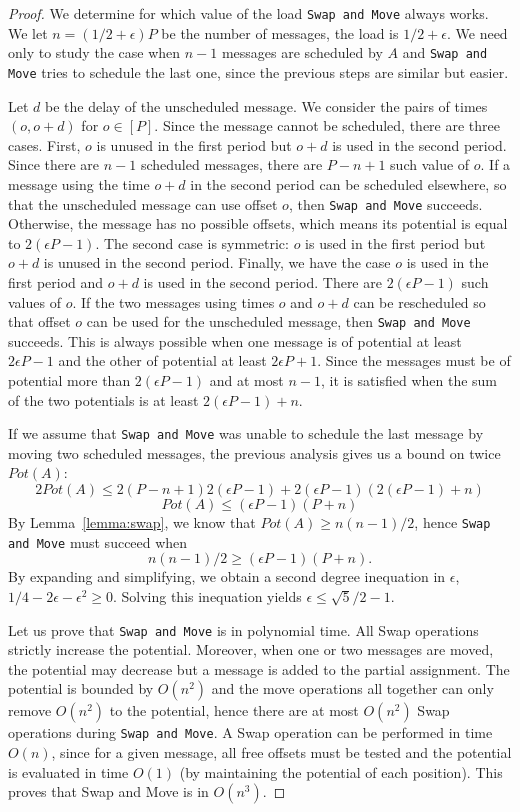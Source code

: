 \documentclass[a4paper,cleveref, autoref, thm-restate,UKenglish]{lipics-v2019}
\newcommand\swapandmove{\texttt{Swap and Move}\xspace}
\begin{document}
\begin{proof}
We determine for which value of the load \swapandmove always works. We let $n = (1/2 + \epsilon)P$ be the number of messages, the load is $1/2 + \epsilon$. We need only to study the case when $n-1$ messages are scheduled by $A$ and \swapandmove tries to schedule the last one, since the previous steps are similar but easier. 

Let $d$ be the delay of the unscheduled message. We consider the pairs 
of times $(o,o+d)$ for $o \in [P]$. Since the message
cannot be scheduled, there are three cases. First, $o$ is unused in the first period but $o+d$ is used in the second period. Since there are $n-1$ scheduled messages, there are $P-n+1$ such value of $o$. If a message using the time $o+d$ in the second period can be scheduled elsewhere, so that the unscheduled message can use offset $o$, then \swapandmove succeeds.
Otherwise, the message has no possible offsets, which means its potential is equal to $2(\epsilon P -1)$.
The second case is symmetric: $o$ is used in the first period but $o+d$ is unused in the second period. 
Finally, we have the case $o$ is used in the first period and $o+d$ is used in the second period.  There are $2(\epsilon P -1)$ such values of $o$. If the two messages using times 
$o$ and $o+d$ can be rescheduled so that offset $o$ can be used for the unscheduled message,
then \swapandmove succeeds. This is always possible when one message is of potential at least $2\epsilon P -1$ and the other of potential at least $2\epsilon P + 1$. Since the messages must be of potential more than $2(\epsilon P -1)$ and at most $n-1$, it is satisfied when the sum of the two potentials is at least $2(\epsilon P -1) + n$.

If we assume that \swapandmove was unable to schedule the last message by moving two scheduled messages, the previous analysis gives us a bound on twice $Pot(A)$: 
$$ 2Pot(A) \leq 2(P-n+1) 2(\epsilon P -1) + 2(\epsilon P -1)(2(\epsilon P -1) + n) $$
$$ Pot(A) \leq (\epsilon P -1) (P + n)$$
By Lemma~\ref{lemma:swap}, we know that $Pot(A) \geq n(n-1)/2$, hence 
\swapandmove must succeed when
$$n(n-1)/2 \geq  (\epsilon P -1) (P + n).$$
By expanding and simplifying, we obtain a second degree inequation in $\epsilon$, $1/4 - 2\epsilon - \epsilon ^2 \geq  0$.
Solving this inequation yields $\epsilon \leq \sqrt{5}/2 -1$.


Let us prove that \swapandmove is in polynomial time. All Swap operations 
strictly increase the potential. Moreover, when one or two messages are moved, the potential may decrease but
a message is added to the partial assignment. The potential is bounded by $O(n^2)$ and the move operations all together can only remove $O(n^2)$ to the potential, hence there are at most $O(n^2)$ Swap operations during \swapandmove. A Swap operation can be performed in time $O(n)$, since for a given message, all free offsets must be tested and the potential is evaluated in time $O(1)$ (by maintaining the potential of each position). This proves that Swap and Move is in $O(n^3)$.  
\end{proof}
\end{document}

